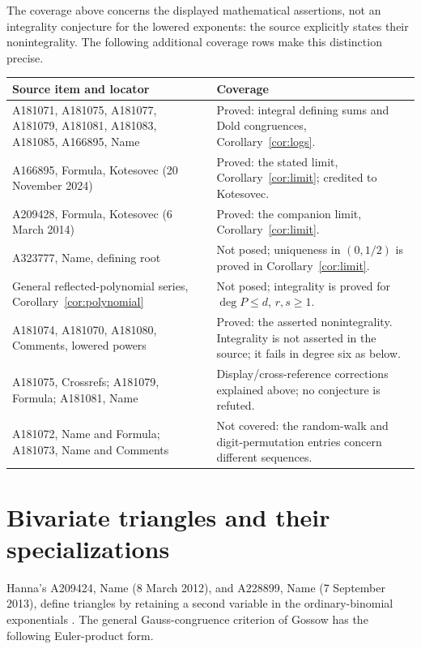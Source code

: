 \documentclass[11pt]{article}
\begin{document}
The coverage above concerns the displayed mathematical assertions, not
an integrality conjecture for the lowered exponents: the source explicitly
states their nonintegrality. The following additional coverage rows make
this distinction precise.
\begin{center}\small
\begin{tabular}{@{}>{\raggedright\arraybackslash}p{.40\linewidth}>{\raggedright\arraybackslash}p{.54\linewidth}@{}}
\toprule
Source item and locator & Coverage\\
\midrule
A181071, A181075, A181077, A181079, A181081, A181083, A181085, A166895, Name
 & Proved: integral defining sums and Dold congruences, Corollary~\ref{cor:logs}.\\
A166895, Formula, Kotesovec (20 November 2024)
 & Proved: the stated limit, Corollary~\ref{cor:limit}; credited to Kotesovec.\\
A209428, Formula, Kotesovec (6 March 2014)
 & Proved: the companion limit, Corollary~\ref{cor:limit}.\\
A323777, Name, defining root
 & Not posed; uniqueness in $(0,1/2)$ is proved in Corollary~\ref{cor:limit}.\\
General reflected-polynomial series, Corollary~\ref{cor:polynomial}
 & Not posed; integrality is proved for $\deg P\le d$, $r,s\ge1$.\\
A181074, A181070, A181080, Comments, lowered powers
 & Proved: the asserted nonintegrality. Integrality is not asserted in the
 source; it fails in degree six as below.\\
A181075, Crossrefs; A181079, Formula; A181081, Name
 & Display/cross-reference corrections explained above; no conjecture is refuted.\\
A181072, Name and Formula; A181073, Name and Comments
 & Not covered: the random-walk and digit-permutation entries concern
 different sequences.\\
\bottomrule
\end{tabular}
\end{center}

\section{Bivariate triangles and their specializations}

Hanna's A209424, Name (8 March 2012), and A228899, Name
(7 September 2013), define triangles by retaining a second variable in
the ordinary-binomial exponentials \cite{triangles}. The general
Gauss-congruence criterion of Gossow \cite[Theorem 3.3]{gossow}
has the following Euler-product form.
\end{document}
